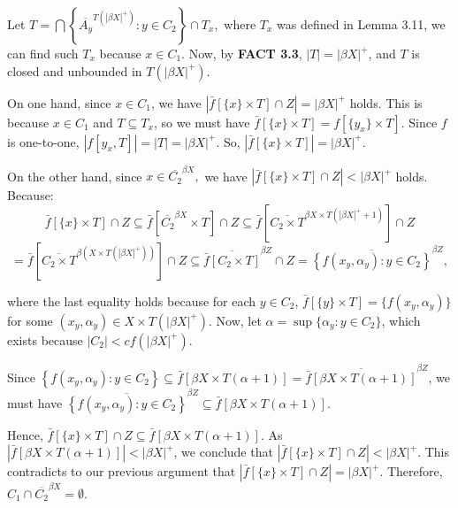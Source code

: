 \documentclass{article}
\begin{document}
\vskip 15pt

Let $T=\bigcap \left\{ \overline{A_y}^{T(|\beta X|^+)} : y\in C_2 \right\}  \cap T_x,$ where $T_x$ was defined in Lemma 3.11, we can find such $T_x$ because $x\in C_1$. Now, by \textbf{FACT 3.3}, $|T|=\left|\beta X\right|^+ $, and $T$ is closed and unbounded in $T(\left|\beta X \right| ^+)$. \\

\vskip 10pt

On one hand, since $x\in C_1$, we have $\left|\bar{f}\left[\{x\} \times T \right] \cap Z \right| = \left|\beta X \right|^+$ holds. This is because    $x\in C_1$ and $T\subseteq T_x$, so we must have $\bar{f}\left[\{x\} \times T \right] = f\left[\{y_x\}\times T\right].$ Since $f$ is one-to-one, $\left|f\left[y_x, T\right]\right|=|T|=\left|\beta X \right| ^+$. So, $\left|\bar{f}\left[\{x\}\times T\right]\right|=|\beta X|^+.$

\vskip 5pt
On the other hand, since $x\in \overline{C_2}^{\beta X},$ we have $\left|\bar{f}\left[\{x\} \times T \right] \cap Z \right| < \left|\beta X \right|^+$ holds. Because: \\
$$\bar{f}\left[\{x\}\times T\right] \cap Z 
\subseteq \bar{f}\left[\overline{C_2}^{\beta X} \times T\right] \cap Z 
\subseteq \bar{f}\left[\overline{C_2\times T}^{\beta X \times T(|\beta X|^+ +1)}\right] \cap Z$$
$$=\bar{f}\left[\overline{C_2\times T}^{\beta \left(X \times T(|\beta X|^+ )\right)}\right] \cap Z
\subseteq \overline{\bar{f}\left[C_2\times T\right]}^{\beta Z} \cap Z
=\overline{    \left\{ f(x_y,\alpha_y): y\in C_2 \right\}        }^{\beta Z},$$

where the last equality holds because for each $y\in C_2$, $\bar{f}\left[\{y\}\times T \right]=\{f(x_y,\alpha_y)\}$ for some $(x_y,\alpha_y)\in X\times T(|\beta X|^+).$ Now, let $\alpha=\sup\{\alpha_y: y\in C_2\}$, which exists because $|C_2|< cf\left( \left|\beta X\right|^+ \right)$. 

Since $\left\{ f(x_y,\alpha_y): y\in C_2 \right\} 
\subseteq \bar{f}\left[\beta X \times T(\alpha +1) \right] = \overline{ \bar{f}\left[\beta X \times T(\alpha +1) \right]}^{\beta Z}$, we must have $\overline{    \left\{ f(x_y,\alpha_y): y\in C_2 \right\}        }^{\beta Z} \subseteq \bar{f}\left[\beta X \times T(\alpha +1) \right] $. 

Hence, $\bar{f}\left[\{x\}\times T\right] \cap Z \subseteq \bar{f}\left[\beta X \times T(\alpha +1) \right].$ 
As $\left| \bar{f}\left[\beta X \times T(\alpha +1) \right] \right| < |\beta X |^+$, we conclude that 
$\left|\bar{f}\left[\{x\} \times T \right] \cap Z \right| < \left|\beta X \right|^+$. This contradicts to our 
previous argument that $ \left|\bar{f}\left[\{x\} \times T \right] \cap Z \right| = \left|\beta X \right|^+$. Therefore, 
$C_1\cap \overline{C_2}^{\beta X}=\emptyset$. 
\end{document}
